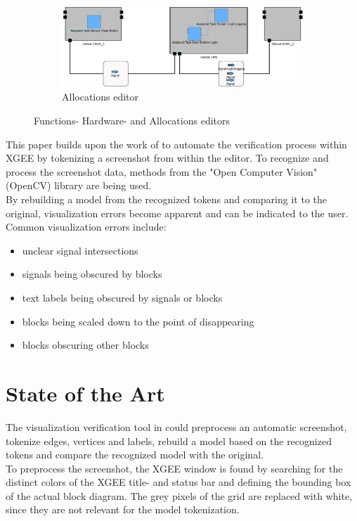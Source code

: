 \begin{figure}[h]
    \hfill
    \begin{subfigure}{0.3\textwidth}
        \includegraphics[width=\linewidth]{Pictures/allocations_editor.png}
        \caption{Allocations editor}
        \label{fig_allocations_editor_en}
    \end{subfigure}

    \caption{Functions- Hardware- and Allocations editors}
    \label{fig_editors_en}
\end{figure}
This paper builds upon the work of \cite{og_paper} to automate the verification process within XGEE by tokenizing a screenshot from within the editor. To recognize and process the screenshot data, methods from the "Open Computer Vision" (OpenCV) library are being used.\\
By rebuilding a model from the recognized tokens and comparing it to the original, visualization errors become apparent and can be indicated to the user.
Common visualization errors include:
\begin{itemize}
    \item unclear signal intersections
    \item signals being obscured by blocks
    \item text labels being obscured by signals or blocks
    \item blocks being scaled down to the point of disappearing
    \item blocks obscuring other blocks
\end{itemize}

\section{State of the Art}
\label{sec_state_of_the_art}

The visualization verification tool in \cite{og_paper} could preprocess an automatic screenshot, tokenize edges, vertices and labels, rebuild a model based on the recognized tokens and compare the recognized model with the original.\\
To preprocess the screenshot, the XGEE window is found by searching for the distinct colors of the XGEE title- and status bar and defining the bounding box of the actual block diagram. The grey pixels of the grid are replaced with white, since they are not relevant for the model tokenization.

